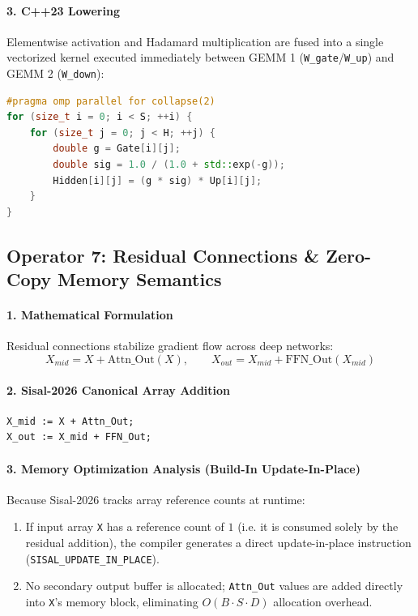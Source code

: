 \paragraph{3. C++23 Lowering}
Elementwise activation and Hadamard multiplication are fused into a single vectorized kernel executed immediately between GEMM 1 (\texttt{W\_gate}/\texttt{W\_up}) and GEMM 2 (\texttt{W\_down}):
\begin{lstlisting}[language=C++]
#pragma omp parallel for collapse(2)
for (size_t i = 0; i < S; ++i) {
    for (size_t j = 0; j < H; ++j) {
        double g = Gate[i][j];
        double sig = 1.0 / (1.0 + std::exp(-g));
        Hidden[i][j] = (g * sig) * Up[i][j];
    }
}
\end{lstlisting}

\subsection{Operator 7: Residual Connections \& Zero-Copy Memory Semantics}
\label{subsec:op_residuals}

\paragraph{1. Mathematical Formulation}
Residual connections stabilize gradient flow across deep networks:
\begin{equation}
X_{mid} = X + \text{Attn\_Out}(X), \qquad X_{out} = X_{mid} + \text{FFN\_Out}(X_{mid})
\end{equation}

\paragraph{2. Sisal-2026 Canonical Array Addition}
\begin{lstlisting}[language=Sisal]
% Canonical elementwise residual addition across array tensors
X_mid := X + Attn_Out;
X_out := X_mid + FFN_Out;
\end{lstlisting}

\paragraph{3. Memory Optimization Analysis (Build-In Update-In-Place)}
Because Sisal-2026 tracks array reference counts at runtime:
\begin{enumerate}
  \item If input array \texttt{X} has a reference count of $1$ (i.e. it is consumed solely by the residual addition), the compiler generates a direct update-in-place instruction (\texttt{SISAL\_UPDATE\_IN\_PLACE}).
  \item No secondary output buffer is allocated; \texttt{Attn\_Out} values are added directly into \texttt{X}'s memory block, eliminating $O(B \cdot S \cdot D)$ allocation overhead.
\end{enumerate}

